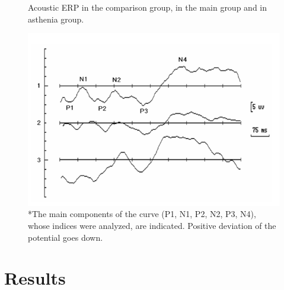 \documentclass[twocolumn]{article}
\begin{document}
\begin{figure}
\caption{Acoustic ERP in the comparison group, in the main group and in asthenia group.}
\label{fig1}
\includegraphics[width=\linewidth ]{fig1.png}
\caption*{*The main components of the curve (P1, N1, P2, N2, P3, N4), whose indices were analyzed, are indicated. Positive deviation of the potential goes down.}
\end{figure}
\section{Results}
\end{document}
